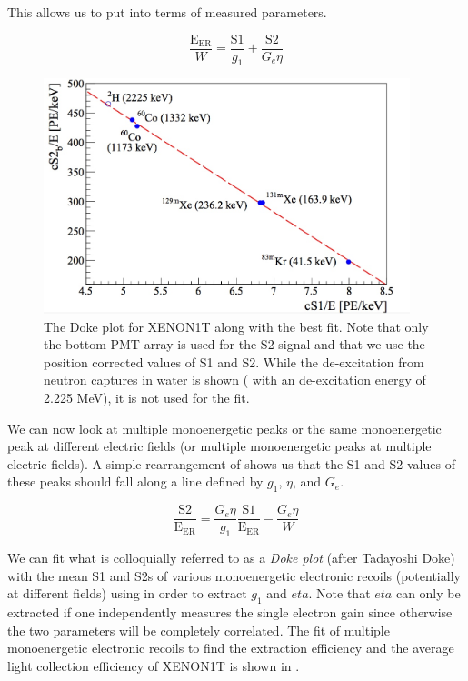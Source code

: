   This allows us to put  into terms of measured parameters.
  
\begin{equation}
        \label{eqn:xe1t_anticorrelation_s1_s2}
        \frac{\textrm{E}_{\textrm{ER}}}{W} = \frac{\textrm{S1}}{g_1} + \frac{\textrm{S2}}{G_e \eta}
\end{equation}
 
  \begin{figure}[t]
	\centering
	\includegraphics[width=0.95\textwidth]{xe1t_doke_plot}
	\caption{The Doke plot for XENON1T along with the best fit.  Note that only the bottom PMT array is used for the S2 signal and that we use the position corrected values of S1 and S2.  While the de-excitation from neutron captures in water is shown ( with an de-excitation energy of 2.225 MeV), it is not used for the fit.}
	\label{fig:xe1t_doke_plot}
\end{figure}

 
We can now look at multiple monoenergetic peaks or the same monoenergetic peak at different electric fields (or multiple monoenergetic peaks at multiple electric fields).  A simple rearrangement of  shows us that the S1 and S2 values of these peaks should fall along a line defined by $g_1$, $\eta$, and $G_e$.

 \begin{equation}
        \label{eqn:xe1t_anticorrelation_line}
        \frac{\textrm{S2}}{\textrm{E}_{\textrm{ER}}} = \frac{G_e \eta}{g_1} \frac{\textrm{S1}}{\textrm{E}_{\textrm{ER}}} - \frac{G_e \eta}{W}
\end{equation}
 
 We can fit what is colloquially referred to as a \textit{Doke plot} (after Tadayoshi Doke) with the mean S1 and S2s of various monoenergetic electronic recoils (potentially at different fields) using  in order to extract $g_1$ and $eta$.  Note that $eta$ can only be extracted if one independently measures the single electron gain since otherwise the two parameters will be completely correlated.  The fit of multiple monoenergetic electronic recoils to find the extraction efficiency and the average light collection efficiency of XENON1T is shown in . 
 
